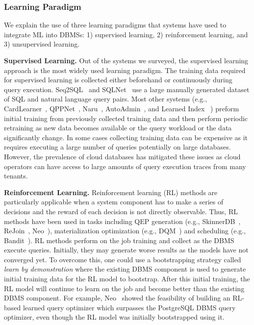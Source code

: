 \subsubsection{Learning Paradigm}
We explain the use of three learning paradigms that systems have used to integrate ML into DBMSs: 1) supervised learning, 2) reinforcement learning, and 3) unsupervised learning.

\vspace{2mm}
\noindent \textbf{Supervised Learning.} Out of the systems we surveyed, the supervised learning approach is the most widely used learning paradigm.
The training data required for supervised learning is collected either beforehand or continuously during query execution.
Seq2SQL~\cite{seq2sql} and SQLNet~\cite{sqlnet} use a large manually generated dataset of SQL and natural language query pairs.
Most other systems (e.g., CardLearner~\cite{cardlearner}, QPPNet~\cite{qppnet}, Naru~\cite{naru}, AutoAdmin~\cite{autoadmin, autoadmin_2}, and Learned Index ~\cite{learnedindex}) preform initial training from previously collected training data and then perform periodic retraining as new data becomes available or the query workload or the data significantly change.
In some cases collecting training data can be expensive as it requires executing a large number of queries potentially on large databases.
However, the prevalence of cloud databases has mitigated these issues as cloud operators can have access to large amounts of query execution traces from many tenants.

\vspace{2mm}
\noindent \textbf{Reinforcement Learning.} Reinforcement learning (RL) methods are particularly applicable when a system component has to make a series of decisions and the reward of each decision is not directly observable.
Thus, RL methods have been used in tasks including QEP generation (e.g., SkinnerDB~\cite{skinnerdb}, ReJoin~\cite{rejoin}, Neo~\cite{neo}), materialization optimization (e.g., DQM~\cite{dqm}) and scheduling (e.g., Bandit~\cite{bandit}).
RL methods perform on the job training and collect as the DBMS execute queries.
Initially, they may generate worse results as the models have not converged yet.
To overcome this, one could use a bootstrapping strategy called  \textit{learn by demonstration} where the existing DBMS component is used to generate initial training data for the RL model to bootstrap.
After this initial training, the RL model will continue to learn on the job and become better than the existing DBMS component.
For example, Neo~\cite{neo} showed the feasibility of building an RL-based learned query optimizer which surpasses the PostgreSQL DBMS query optimizer, even though the RL model was initially bootstrapped using it.


